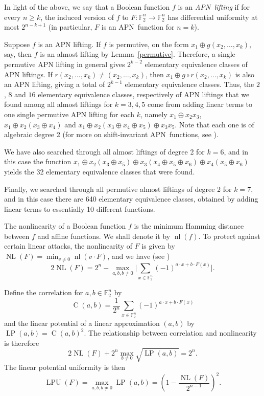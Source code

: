 \documentclass[11pt,english,a4paper]{amsart}
\theoremstyle{plain}
\theoremstyle{definition}
\theoremstyle{remark}
\newcommand{\F}{\mathbb{F}}
\begin{document}
        In light of the above, we say that a Boolean function $f$ is an \emph{APN~lifting} if for every $n\geq k$, the induced version of $f$ to $F\colon\F_2^n\to\F_2^n$ has differential uniformity at most $2^{n-k+1}$ (in particular, $F$ is an APN~function for $n=k$).
  
        Suppose $f$ is an APN lifting. If $f$ is permutive, on the form $x_1 \oplus g(x_2, \dotsc, x_k)$, say, then $f$ is an almost lifting by Lemma~\ref{permutive}. Therefore, a single permutive APN lifting in general gives $2^{k-2}$ elementary equivalence classes of APN liftings. If $r(x_2, \dotsc, x_k) \neq (x_2, \dotsc, x_k)$, then $x_1 \oplus g \circ r (x_2, \dotsc, x_k)$ is also an APN lifting, giving a total of $2^{k-1}$ elementary equivalence classes. Thus, the $2$, $8$ and $16$ elementary equivalence classes, respectively of APN liftings that we found among all almost liftings for $k=3, 4, 5$ come from adding linear terms to one single permutive APN lifting for each $k$, namely $x_1 \oplus x_2 x_3$, $x_1 \oplus x_2 (x_3 \oplus x_4)$ and $x_1 \oplus x_2 (x_3 \oplus x_4 \oplus x_5) \oplus x_3 x_5$. Note that each one is of algebraic degree 2 (for more on shift-invariant APN~functions, see \cite[Section~4.2]{carlet-APNRS}).

        We have also searched through all almost liftings of degree 2 for $k=6$, and in this case the function $x_1 \oplus x_2 (x_3 \oplus x_5) \oplus x_3 (x_4 \oplus x_5 \oplus x_6) \oplus x_4 (x_5 \oplus x_6)$ yields the 32 elementary equivalence classes that were found.

        Finally, we searched through all permutive almost liftings of degree 2 for $k=7$, and in this case there are 640 elementary equivalence classes, obtained by adding linear terms to essentially 10 different functions.

    
    
	\medskip
	
	The nonlinearity of a Boolean function $f$ is the minimum Hamming distance between $f$ and affine functions. We shall denote it by $\operatorname{nl}(f)$.
	To protect against certain linear attacks, the nonlinearity of $F$ is given by $\operatorname{NL}(F)=\min_{v\neq 0}\operatorname{nl}(v\cdot F)$, and we have (see \cite[Definition~29]{carlet-book})
	\[
	2\operatorname{NL}(F)=2^n-\max_{a,b,b\neq 0} \Big\lvert\sum_{x\in\F_2^n}(-1)^{a\cdot x+b\cdot F(x)}\Big\rvert.
	\]
    
	Define the correlation for $a,b\in\F_2^n$ by
	\[
	\operatorname{C}(a,b)=\frac{1}{2^n}\sum_{x\in\F_2^n}(-1)^{a\cdot x + b\cdot F(x)}
	\]
	and the linear potential of a linear approximation $(a,b)$ by $\operatorname{LP}(a,b)=\operatorname{C}(a,b)^2$.
	The relationship between correlation and nonlinearity is therefore
	\[
	2\operatorname{NL}(F)+2^n\max_{b\neq 0}\sqrt{\operatorname{LP}(a,b)}=2^n.
	\]
	The linear potential uniformity is then
	\[
	\operatorname{LPU}(F)=\max_{a,b,b\neq 0}\operatorname{LP}(a,b) = \left( 1 - \frac{\operatorname{NL}(F)}{2^{n-1}} \right)^2.
	\]
	
\end{document}
